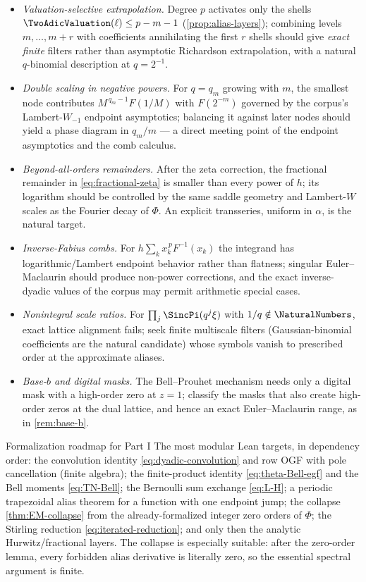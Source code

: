 \begin{itemize}
\item\emph{Valuation-selective extrapolation.}  Degree $p$ activates
only the shells $\TwoAdicValuation(\ell)\le p-m-1$
(\cref{prop:alias-layers}); combining levels $m,\dots,m+r$ with
coefficients annihilating the first $r$ shells should give
\emph{exact finite} filters rather than asymptotic Richardson
extrapolation, with a natural $q$-binomial description at
$q=2^{-1}$.
\item\emph{Double scaling in negative powers.}  For $q=q_m$ growing
with $m$, the smallest node contributes
$M^{\,q_m-1}F(1/M)$ with $F(2^{-m})$ governed by the corpus's
Lambert-$W_{-1}$ endpoint asymptotics; balancing it against later
nodes should yield a phase diagram in $q_m/m$ --- a direct meeting
point of the endpoint asymptotics and the comb calculus.
\item\emph{Beyond-all-orders remainders.}  After the zeta correction,
the fractional remainder in \eqref{eq:fractional-zeta} is smaller
than every power of $h$; its logarithm should be controlled by the
same saddle geometry and Lambert-$W$ scales as the Fourier decay of
$\Phi$.  An explicit transseries, uniform in $\alpha$, is the
natural target.
\item\emph{Inverse-Fabius combs.}  For
$h\sum_k x_k^{\,p}F^{-1}(x_k)$ the integrand has
logarithmic/Lambert endpoint behavior rather than flatness; singular
Euler--Maclaurin should produce non-power corrections, and the exact
inverse-dyadic values of the corpus may permit arithmetic special
cases.
\item\emph{Nonintegral scale ratios.}  For
$\prod_j\SincPi(q^{j}\xi)$ with $1/q\notin\NaturalNumbers$, exact lattice
alignment fails; seek finite multiscale filters (Gaussian-binomial
coefficients are the natural candidate) whose symbols vanish to
prescribed order at the approximate aliases.
\item\emph{Base-$b$ and digital masks.}  The Bell--Prouhet mechanism
needs only a digital mask with a high-order zero at $z=1$; classify
the masks that also create high-order zeros at the dual lattice, and
hence an exact Euler--Maclaurin range, as in \cref{rem:base-b}.
\end{itemize}

\begin{statusbox}{Formalization roadmap for Part I}
The most modular Lean targets, in dependency order: the convolution
identity \eqref{eq:dyadic-convolution} and row OGF with pole
cancellation (finite algebra); the finite-product identity
\eqref{eq:theta-Bell-egf} and the Bell moments \eqref{eq:TN-Bell};
the Bernoulli sum exchange \eqref{eq:L-H}; a periodic trapezoidal
alias theorem for a function with one endpoint jump; the collapse
\cref{thm:EM-collapse} from the already-formalized integer zero
orders of $\Phi$; the Stirling reduction
\eqref{eq:iterated-reduction}; and only then the analytic
Hurwitz/fractional layers.  The collapse is especially suitable: after
the zero-order lemma, every forbidden alias derivative is literally
zero, so the essential spectral argument is finite.
\end{statusbox}

